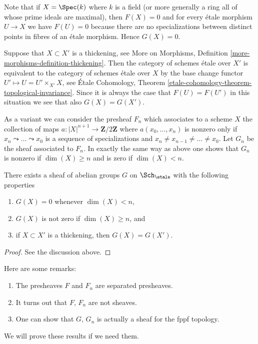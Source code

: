 \medskip\noindent
Note that if $X = \Spec(k)$ where $k$ is a field (or more generally
a ring all of whose prime ideals are maximal), then $F(X) = 0$
and for every \'etale morphism $U \to X$ we have $F(U) = 0$ because there
are no specializations between distinct points in fibres of an \'etale
morphism. Hence $G(X) = 0$.

\medskip\noindent
Suppose that $X \subset X'$ is a thickening, see
More on Morphisms, Definition \ref{more-morphisms-definition-thickening}.
Then the category of schemes \'etale over $X'$ is equivalent to the
category of schemes \'etale over $X$ by the base change functor
$U' \mapsto U = U' \times_{X'} X$, see
\'Etale Cohomology,
Theorem \ref{etale-cohomology-theorem-topological-invariance}.
Since it is always the case that $F(U) = F(U')$ in this situation
we see that also $G(X) = G(X')$.

\medskip\noindent
As a variant we can consider the presheaf $F_n$ which associates
to a scheme $X$ the collection of maps
$a : |X|^{n + 1} \to \mathbf{Z}/2\mathbf{Z}$ where $a(x_0, \ldots, x_n)$
is nonzero only if $x_n \leadsto \ldots \leadsto x_0$ is a sequence of
specializations and $x_n \not = x_{n - 1} \not = \ldots \not = x_0$.
Let $G_n$ be the sheaf associated to $F_n$.
In exactly the same way as above one shows that $G_n$ is nonzero
if $\dim(X) \geq n$ and is zero if $\dim(X) < n$.

\begin{lemma}
\label{lemma-sheaf-zero-on-low-dimension}
There exists a sheaf of abelian groups $G$ on
$\Sch_\etale$ with the following properties
\begin{enumerate}
\item $G(X) = 0$ whenever $\dim(X) < n$,
\item $G(X)$ is not zero if $\dim(X) \geq n$, and
\item if $X \subset X'$ is a thickening, then $G(X) = G(X')$.
\end{enumerate}
\end{lemma}

\begin{proof}
See the discussion above.
\end{proof}

\begin{remark}
\label{remark-specialization}
Here are some remarks:
\begin{enumerate}
\item The presheaves $F$ and $F_n$ are separated presheaves.
\item It turns out that $F$, $F_n$ are not sheaves.
\item One can show that $G$, $G_n$ is actually a sheaf for the fppf topology.
\end{enumerate}
We will prove these results if we need them.
\end{remark}


